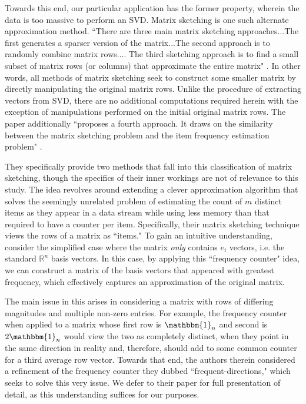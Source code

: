 \documentclass[journal]{IEEEtran}
\begin{document}
Towards this end, our particular application has the former property, wherein the data is too massive to perform an SVD. Matrix sketching is one such alternate approximation method. ``There are three main matrix sketching approaches...The first generates a sparser version of the matrix...The second approach is to randomly combine matrix rows.... The third sketching approach is to find a small subset of matrix rows (or columns) that approximate the entire matrix" \cite{sketch}. In other words, all methods of matrix sketching seek to construct some smaller matrix by directly manipulating the original matrix rows. Unlike the procedure of extracting vectors from SVD, there are no additional computations required herein with the exception of manipulations performed on the initial original matrix rows. The paper additionally ``proposes a fourth approach. It draws on the similarity between the matrix sketching problem and the item frequency estimation problem" \cite{sketch}.

They specifically provide two methods that fall into this classification of matrix sketching, though the specifics of their inner workings are not of relevance to this study. The idea revolves around extending a clever approximation algorithm that solves the seemingly unrelated problem of estimating the count of $m$ distinct items as they appear in a data stream while using less memory than that required to have a counter per item. Specifically, their matrix sketching technique views the rows of a matrix as ``items." To gain an intuitive understanding, consider the simplified case where the matrix \textit{only} contains $e_i$ vectors, i.e. the standard $\mathbb{R}^n$ basis vectors. In this case, by applying this ``frequency counter" idea, we can construct a matrix of the basis vectors that appeared with greatest frequency, which effectively captures an approximation of the original matrix.

The main issue in this arises in considering a matrix with rows of differing magnitudes and multiple non-zero entries. For example, the frequency counter when applied to a matrix whose first row is $\mathbbm{1}_n$ and second is $2\mathbbm{1}_n$ would view the two as completely distinct, when they point in the same direction in reality and, therefore, should add to some common counter for a third average row vector. Towards that end, the authors therein considered a refinement of the frequency counter they dubbed ``frequent-directions," which seeks to solve this very issue. We defer to their paper for full presentation of detail, as this understanding suffices for our purposes.
\end{document}
